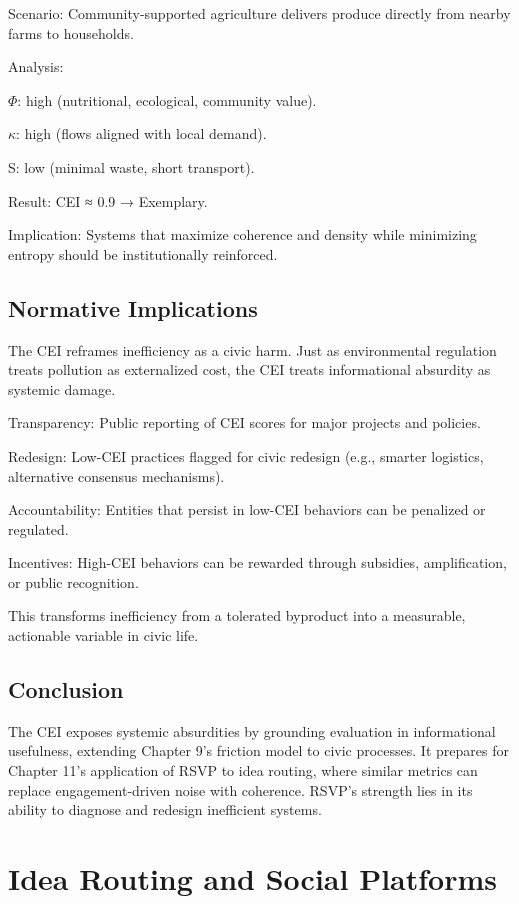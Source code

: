 \documentclass{book}
\begin{document}
Scenario: Community-supported agriculture delivers produce directly from nearby farms to households.

Analysis:

\(\Phi\): high (nutritional, ecological, community value).

\(\kappa\): high (flows aligned with local demand).

S: low (minimal waste, short transport).

Result: CEI ≈ 0.9 → Exemplary.

Implication: Systems that maximize coherence and density while minimizing entropy should be institutionally reinforced.

\section{Normative Implications}

The CEI reframes inefficiency as a civic harm. Just as environmental regulation treats pollution as externalized cost, the CEI treats informational absurdity as systemic damage.

Transparency: Public reporting of CEI scores for major projects and policies.

Redesign: Low-CEI practices flagged for civic redesign (e.g., smarter logistics, alternative consensus mechanisms).

Accountability: Entities that persist in low-CEI behaviors can be penalized or regulated.

Incentives: High-CEI behaviors can be rewarded through subsidies, amplification, or public recognition.

This transforms inefficiency from a tolerated byproduct into a measurable, actionable variable in civic life.

\section{Conclusion}

The CEI exposes systemic absurdities by grounding evaluation in informational usefulness, extending Chapter 9’s friction model to civic processes. It prepares for Chapter 11’s application of RSVP to idea routing, where similar metrics can replace engagement-driven noise with coherence. RSVP’s strength lies in its ability to diagnose and redesign inefficient systems.

\chapter{Idea Routing and Social Platforms}
\end{document}
